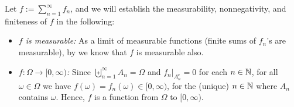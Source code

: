 \begin{enumerate}
\begin{pf}
Let \(f:=\sum_{n=1}^{\infty}f_n\), and we will establish the measurability,
nonnegativity, and finiteness of \(f\) in the following:
\begin{itemize}
\item \emph{\(f\) is measurable:} As a limit of measurable functions (finite
sums of \(f_n\)'s are measurable), by  we know that
\(f\) is measurable also.
\item \emph{\(f:\Omega\to[0,\infty)\):} Since
\(\biguplus_{n=1}^{\infty}A_n=\Omega\) and \(f_n|_{A_n^{c}}=0\) for each
\(n\in\mathbb{N}\), for all \(\omega\in\Omega\) we have \(f(\omega)=f_n(\omega)\in
[0,\infty)\), for the (unique) \(n\in\mathbb{N}\) where \(A_n\) contains \(\omega\).
Hence, \(f\) is a function from \(\Omega\) to \([0,\infty)\).
\end{itemize}


\end{pf}
\end{enumerate}
